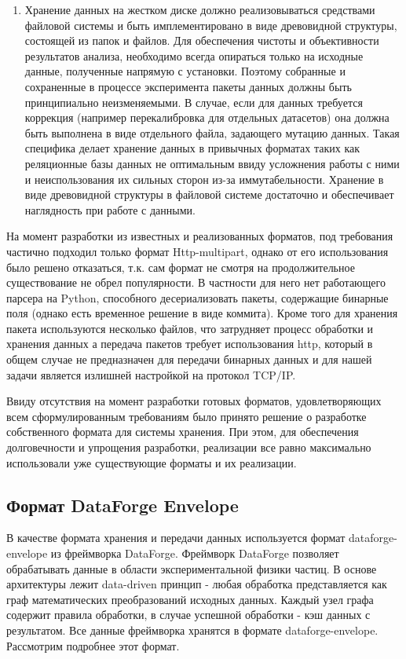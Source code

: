 \documentclass[a4paper,14pt]{extreport}
\begin{document}
\begin{enumerate}
    \item Хранение данных на жестком диске должно реализовываться средствами файловой системы и быть имплементировано в виде древовидной структуры, состоящей из папок и файлов. Для обеспечения чистоты и объективности результатов анализа, необходимо всегда опираться только на исходные данные, полученные напрямую с установки. Поэтому собранные и сохраненные в процессе эксперимента пакеты данных должны быть принципиально неизменяемыми. В случае, если для данных требуется коррекция (например перекалибровка для отдельных датасетов) она должна быть выполнена в виде отдельного файла, задающего мутацию данных. Такая специфика делает хранение данных в привычных форматах таких как реляционные базы данных не оптимальным ввиду усложнения работы с ними и неиспользования их сильных сторон из-за иммутабельности. Хранение в виде древовидной структуры в файловой системе достаточно и обеспечивает наглядность при работе с данными.
\end{enumerate}

На момент разработки из известных и реализованных форматов, под требования частично подходил только формат Http-multipart, однако от его использования было решено отказаться, т.к. сам формат не смотря на продолжительное существование не обрел популярности. В частности для него нет работающего парсера на Python, способного десериализовать пакеты, содержащие бинарные поля (однако есть временное решение в виде коммита\cite{multipart-fix}). Кроме того для хранения пакета используются несколько файлов, что затрудняет процесс обработки и хранения данных а передача пакетов требует использования http, который в общем случае не предназначен для передачи бинарных данных и для нашей задачи является излишней настройкой на протокол TCP/IP.

Ввиду отсутствия на момент разработки готовых форматов, удовлетворяющих всем сформулированным требованиям было принято решение о разработке собственного формата для системы хранения. При этом, для обеспечения долговечности и упрощения разработки, реализации все равно максимально использовали уже существующие форматы и их реализации.

\subsection{Формат DataForge Envelope}

В качестве формата хранения и передачи данных используется формат dataforge-envelope из фреймворка DataForge\cite{dataforge}. Фреймворк DataForge позволяет обрабатывать данные в области экспериментальной физики частиц. В основе архитектуры лежит data-driven принцип - любая обработка представляется как граф математических преобразований исходных данных. Каждый узел графа содержит правила обработки, в случае успешной обработки - кэш данных с результатом. Все данные фреймворка хранятся в формате dataforge-envelope. Рассмотрим подробнее этот формат.
\end{document}
